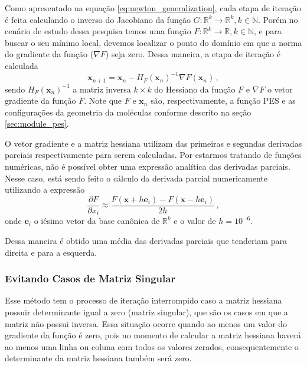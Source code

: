 Como apresentado na equação \eqref{eq:newton_generalization}, cada etapa de iteração é feita calculando o inverso do Jacobiano da função $G: {\mathds{R}^k\to\mathds{R}^k}, k \in \mathds{N}$. Porém no cenário de estudo dessa pesquisa temos uma função $F: {\mathds{R}^k\to\mathds{R}}, k \in \mathds{N}$, e para buscar o seu mínimo local, devemos localizar o ponto do domínio em que a norma do gradiente da função ($\nabla F$) seja zero. Dessa maneira, a etapa de iteração é calculada %
%
\begin{equation}
  \mathbf{x}_{n+1} = \mathbf{x}_n - H_F(\mathbf{x}_n)^{-1} \nabla F(\mathbf{x}_n) \,,
\end{equation}
%
sendo $H_F(\mathbf{x}_n)^{-1}$ a matriz inversa $k \times k$ do Hessiano da função $F$ e $\nabla F$ o vetor gradiente da função $F$. Note que $F$ e $\mathbf{x}_n$ são, respectivamente, a função PES e as configurações da geometria da moléculas conforme descrito na seção \ref{sec:module_pes}. 

O vetor gradiente e a matriz hessiana utilizam das primeiras e segundas derivadas parciais respectivamente para serem calculadas. Por estarmos tratando de funções numéricas, não é possível obter uma expressão analítica das derivadas parciais. Nesse caso, está sendo feito o cálculo da derivada parcial numericamente utilizando a expressão
%
\begin{equation}
  \label{eq:partial_derivative}
  \frac{\partial F}{\partial x_i} \approx \frac{F(\mathbf{x}+h \mathbf{e}_i) - F(\mathbf{x}-h \mathbf{e}_i)}{2h} \,,
\end{equation}
%
onde $\mathbf{e}_i$ o iésimo vetor da base canônica de $\mathds{R}^k$ e o valor de $h = 10^{-6}$.

Dessa maneira é obtido uma média das derivadas parciais que tenderiam para direita e para a esquerda.

\subsubsection{Evitando Casos de Matriz Singular}

Esse método tem o processo de iteração interrompido caso a matriz hessiana possuir determinante igual a zero (matriz singular), que são os casos em que a matriz não possui inversa. Essa situação ocorre quando ao menos um valor do gradiente da função é zero, pois no momento de calcular a matriz hessiana haverá ao menos uma linha ou coluna com todos os valores zerados, consequentemente o determinante da matriz hessiana também será zero.

